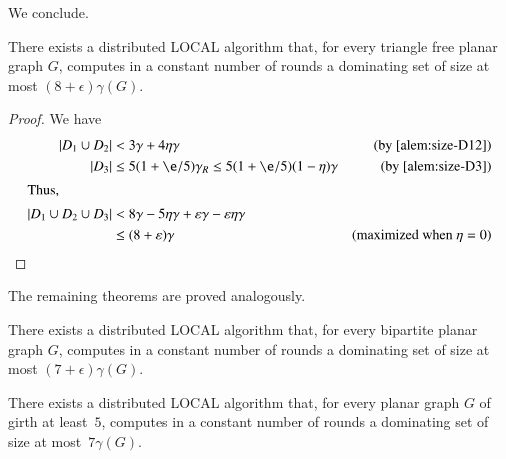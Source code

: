 \pagebreak
We conclude. 

\begin{theorem}\label{thm:tri}
There exists a distributed LOCAL algorithm that, for every triangle free planar
graph $G$, computes in a constant number of rounds a dominating set
of size at most $(8+\epsilon)\gamma(G)$.
\end{theorem}
\begin{proof}
	We have
	\begin{align*}
		|D_1\cup D_2|&<3\gamma+4\eta\gamma&\text{(by \cref{alem:size-D12})}\\
		|D_3|&\le 5(1+\e/5)\gamma_R\leq 5(1+\e/5)(1-\eta)\gamma	&\text{(by \cref{alem:size-D3})}\\
			\intertext{Thus,}
		|D_1 \cup D_2 \cup D_3| &< 8\gamma -5\eta\gamma+\epsilon\gamma-\epsilon\eta\gamma\\
		&\leq  (8+\epsilon) \gamma&\text{(maximized when $\eta=0$)}
	\end{align*}
\end{proof}

The remaining theorems are proved analogously. 

\begin{theorem}\label{thm:bip}
  There exists a distributed LOCAL algorithm that, for every bipartite planar graph
  $G$, computes in a constant number of rounds a
  dominating set of size at most $(7+\epsilon)\gamma(G)$.
\end{theorem}

\begin{theorem}\label{thm:girth}
  There exists a distributed LOCAL algorithm that, for every planar graph
  $G$ of girth at least~$5$, computes in a constant number of rounds a
  dominating set of size at most~$7\gamma(G)$.
\end{theorem}

